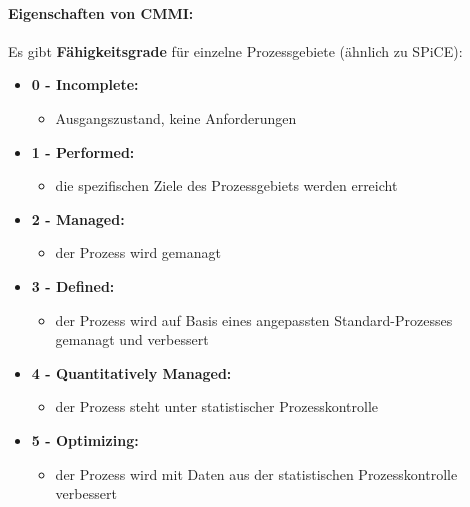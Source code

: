 \paragraph{Eigenschaften von CMMI:}
Es gibt \textbf{Fähigkeitsgrade} für einzelne Prozessgebiete (ähnlich zu SPiCE):
\begin{itemize}
	\item \textbf{0 - Incomplete:} 
	\begin{itemize}
		\item Ausgangszustand, keine Anforderungen
	\end{itemize}
	\item \textbf{1 - Performed: } 
	\begin{itemize}
		\item die spezifischen Ziele des Prozessgebiets werden erreicht
	\end{itemize}
	\item \textbf{2 - Managed:} 
	\begin{itemize}
		\item der Prozess wird gemanagt
	\end{itemize}
	\item \textbf{3 - Defined:} 
	\begin{itemize}
		\item der Prozess wird auf Basis eines angepassten Standard-Prozesses gemanagt und verbessert
	\end{itemize}
	\item \textbf{4 - Quantitatively Managed:} 
	\begin{itemize}
		\item der Prozess steht unter statistischer Prozesskontrolle
	\end{itemize}
	\item \textbf{5 - Optimizing:} 
	\begin{itemize}
		\item der Prozess wird mit Daten aus der statistischen Prozesskontrolle verbessert
	\end{itemize}
\end{itemize}

